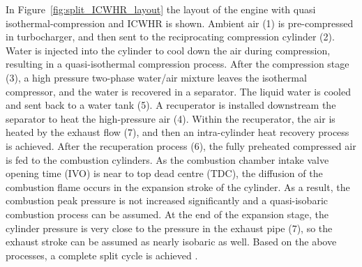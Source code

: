 In Figure~\ref{fig:split_ICWHR_layout} the layout of the engine with quasi isothermal-compression and ICWHR is shown. Ambient air (1) is pre-compressed in  turbocharger, and then sent to the reciprocating compression cylinder (2). Water is injected into the cylinder to cool down the air during compression, resulting in a quasi-isothermal compression process. After the compression stage (3), a high pressure two-phase water/air mixture leaves the isothermal compressor, and the water is recovered in a separator. The liquid water is cooled and sent back to a water tank (5). A recuperator is installed downstream the separator to heat the high-pressure air (4). Within the recuperator, the air is heated by the exhaust flow (7), and then an intra-cylinder heat recovery process is achieved. After the recuperation process (6), the fully preheated compressed air is fed to the combustion cylinders. As the combustion chamber intake valve opening time (IVO) is near to top dead centre (TDC), the diffusion of the combustion flame occurs in the expansion stroke of the cylinder. As a result, the combustion peak pressure is not increased significantly and a quasi-isobaric combustion process can be assumed. At the end of the expansion stage, the cylinder pressure is very close to the pressure in the exhaust pipe (7), so the exhaust stroke can be assumed as nearly isobaric as well. Based on the above processes, a complete split cycle is achieved \cite{Dong2015}.

